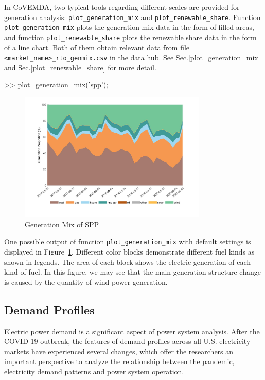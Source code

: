 \documentclass[10pt]{article}
\newcommand{\covemda}{CoVEMDA}
\numberwithin{equation}{section}
\numberwithin{table}{section}
\numberwithin{figure}{section}
\begin{document}
In \covemda{}, two typical tools regarding different scales are provided for generation analysis: \verb!plot_generation_mix! and \verb!plot_renewable_share!. Function \verb!plot_generation_mix! plots the generation mix data in the form of filled areas, and function \verb!plot_renewable_share! plots the renewable share data in the form of a line chart. Both of them obtain relevant data from file \verb!<market_name>_rto_genmix.csv! in the data hub. See Sec.\ref{plot_generation_mix} and Sec.\ref{plot_renewable_share} for more detail.

\begin{Code}
>> plot_generation_mix('spp');
\end{Code}

\begin{figure}[ht]
  \centering
  \noindent\includegraphics[width=0.8\textwidth]{figures/visualization_plot_generation_mix.jpg}
  \caption{Generation Mix of SPP} \label{fig:vis_1}
\end{figure}

One possible output of function \verb!plot_generation_mix! with default settings is displayed in Figure~\ref{fig:vis_1}. Different color blocks demonstrate different fuel kinds as shown in legends. The area of each block shows the electric generation of each kind of fuel. In this figure, we may see that the main generation structure change is caused by the quantity of wind power generation.



\subsection{Demand Profiles}

Electric power demand is a significant aspect of power system analysis. After the COVID-19 outbreak, the features of demand profiles across all U.S. electricity markets have experienced several changes, which offer the researchers an important perspective to analyze the relationship between the pandemic, electricity demand patterns and power system operation.
\end{document}
